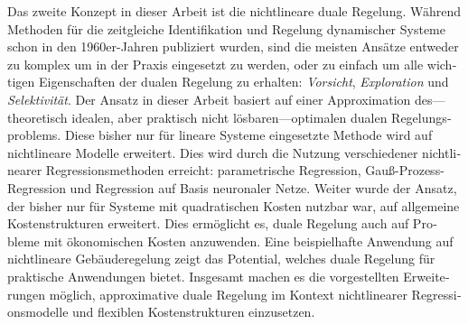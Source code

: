 \begin{otherlanguage}{ngerman}
Das zweite Konzept in dieser Arbeit ist die nichtlineare duale Regelung.
Während Methoden für die zeitgleiche Identifikation und Regelung dynamischer
Systeme schon in den 1960er-Jahren publiziert wurden, sind die meisten Ansätze
entweder zu komplex um in der Praxis eingesetzt zu werden, oder zu einfach um
alle wichtigen Eigenschaften der dualen Regelung zu erhalten: \emph{Vorsicht},
\emph{Exploration} und \emph{Selektivität}. Der Ansatz in dieser Arbeit basiert
auf einer Approximation des---theoretisch idealen, aber praktisch nicht
lösbaren---optimalen dualen Regelungsproblems. Diese bisher nur für lineare
Systeme eingesetzte Methode wird auf nichtlineare Modelle erweitert. Dies wird
durch die Nutzung verschiedener nichtlinearer Regressionsmethoden erreicht:
parametrische Regression, Gauß-Prozess-Regression und Regression auf Basis
neuronaler Netze. Weiter wurde der Ansatz, der bisher nur für Systeme mit
quadratischen Kosten nutzbar war, auf allgemeine Kostenstrukturen erweitert.
Dies ermöglicht es, duale Regelung auch auf Probleme mit ökonomischen Kosten
anzuwenden. Eine beispielhafte Anwendung auf nichtlineare Gebäuderegelung zeigt
das Potential, welches duale Regelung für praktische Anwendungen bietet.
Insgesamt machen es die vorgestellten Erweiterungen möglich, approximative duale
Regelung im Kontext nichtlinearer Regressionsmodelle und flexiblen
Kostenstrukturen einzusetzen.

\end{otherlanguage}

\endgroup
